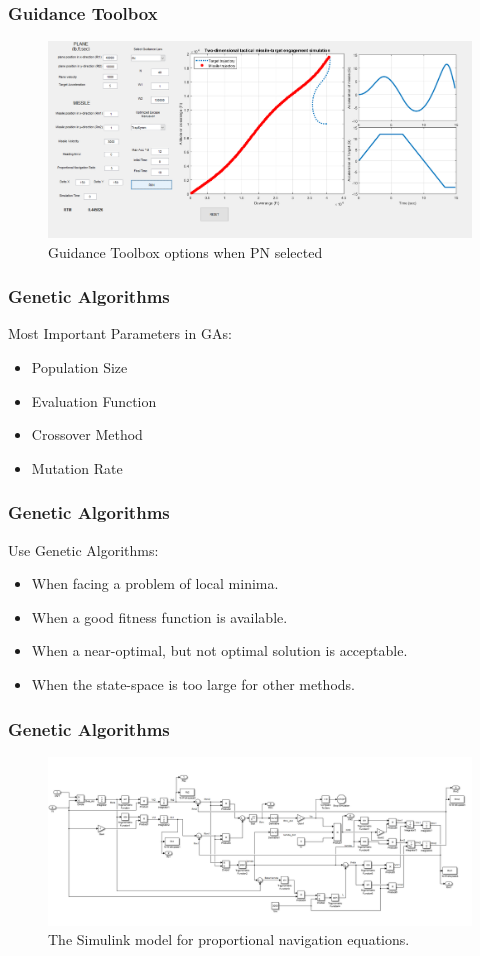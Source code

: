 \documentclass{beamer}
\begin{document}
\begin{frame}
\frametitle{Guidance Toolbox}
\begin{figure}[H]
	\centering
	\includegraphics[scale = 0.3]{fig/guiPN.PNG}
	\caption{Guidance Toolbox options when PN selected}
	\label{Guidance Toolbox PN}
\end{figure}
\end{frame}
\begin{frame}
\frametitle{Genetic Algorithms}
Most Important Parameters in GAs:
\begin{itemize}
\item Population Size
\item Evaluation Function
\item Crossover Method
\item Mutation Rate
\end{itemize}
\end{frame}
\begin{frame}
\frametitle{Genetic Algorithms}
Use Genetic Algorithms:
\begin{itemize}
\item When facing a problem of local minima.
\item When a good fitness function is available.
\item When a near-optimal, but not optimal solution is acceptable.
\item When the state-space is too large for other methods.
\end{itemize}
\end{frame}
\begin{frame}
\frametitle{Genetic Algorithms}
\begin{figure}[H]
	\centering
	\includegraphics[scale = 0.3]{fig/PNeq.PNG}
	\caption{The Simulink model for proportional navigation equations.}
	\label{PN eq}
\end{figure}
\end{frame}
\end{document}
